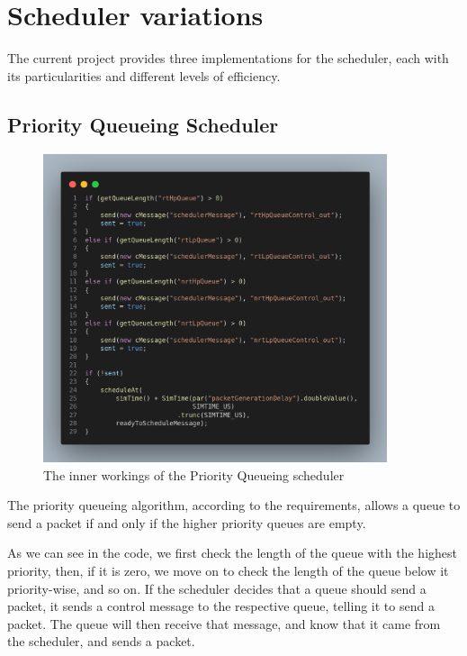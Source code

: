 \documentclass[12pt]{article}
\begin{document}
    \section{Scheduler variations}
    The current project provides three implementations for the scheduler, each with its particularities and different levels of efficiency.

        \subsection{Priority Queueing Scheduler}
        \begin{figure}[htbp!]
            \centering
            \includegraphics[width=0.9\textwidth]{images/pq_code.png}
            \caption{The inner workings of the Priority Queueing scheduler}
        \end{figure}
        \pagebreak
        The priority queueing algorithm, according to the requirements, allows a queue to send a packet if and only if the higher priority queues are empty.
        
        As we can see in the code, we first check the length of the queue with the highest priority, then, if it is zero, we move on to check the length of the queue below it priority-wise, and so on. If the scheduler decides that a queue should send a packet, it sends a control message to the respective queue, telling it to send a packet. The queue will then receive that message, and know that it came from the scheduler, and sends a packet.
        
\end{document}
